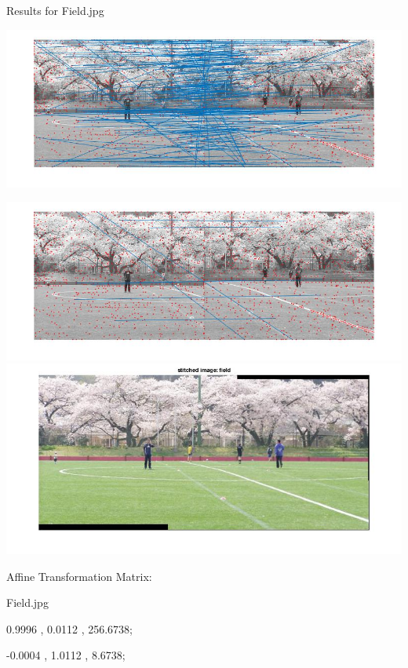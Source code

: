 \documentclass[fleqn]{article}
\begin{document}
\newpage

Results for Field.jpg
\begin{center}
\includegraphics[width=1.2\textwidth]{field1.jpg}

\includegraphics[width=1.2\textwidth]{field2.jpg}
\newline
\includegraphics[width=1.2\textwidth]{field3.jpg}

Affine Transformation Matrix:
\vspace{10 mm}

Field.jpg

0.9996   ,   0.0112   ,    256.6738;

-0.0004  ,   1.0112   ,      8.6738;

\end{center}

\newpage
\end{document}
